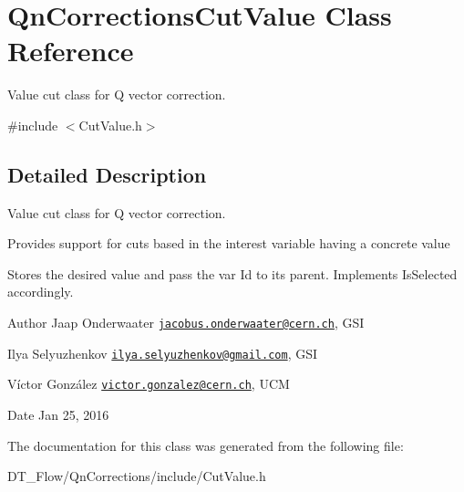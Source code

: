 \hypertarget{classQnCorrectionsCutValue}{}\section{Qn\+Corrections\+Cut\+Value Class Reference}
\label{classQnCorrectionsCutValue}


Value cut class for Q vector correction.  




{\ttfamily \#include $<$Cut\+Value.\+h$>$}



\subsection{Detailed Description}
Value cut class for Q vector correction. 

Provides support for cuts based in the interest variable having a concrete value

Stores the desired value and pass the var Id to its parent. Implements Is\+Selected accordingly.

\begin{DoxyAuthor}{Author}
Jaap Onderwaater \href{mailto:jacobus.onderwaater@cern.ch}{\tt jacobus.\+onderwaater@cern.\+ch}, G\+SI 

Ilya Selyuzhenkov \href{mailto:ilya.selyuzhenkov@gmail.com}{\tt ilya.\+selyuzhenkov@gmail.\+com}, G\+SI 

Víctor González \href{mailto:victor.gonzalez@cern.ch}{\tt victor.\+gonzalez@cern.\+ch}, U\+CM 
\end{DoxyAuthor}
\begin{DoxyDate}{Date}
Jan 25, 2016 
\end{DoxyDate}


The documentation for this class was generated from the following file\+:\begin{DoxyCompactItemize}
\item 
D\+T\+\_\+\+Flow/\+Qn\+Corrections/include/Cut\+Value.\+h\end{DoxyCompactItemize}
